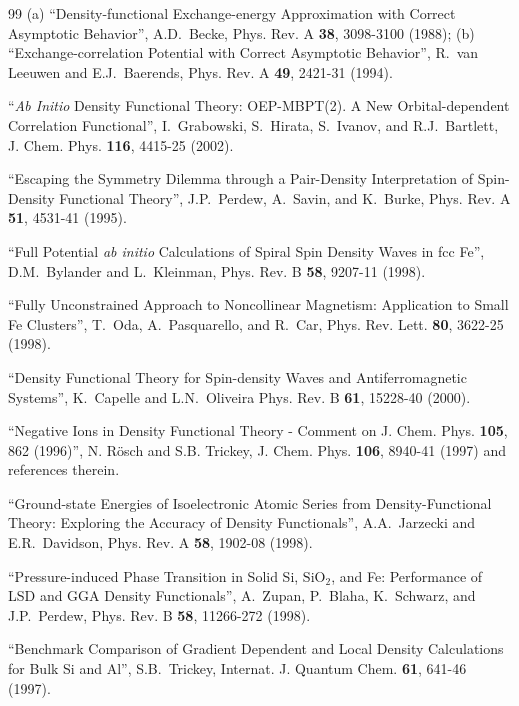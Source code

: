 \documentclass[nofootinbib,floatfix,aps,pra,preprint]{revtex4}
\begin{document}
\begin{thebibliography}{99}
 \textrm{{\small (a) ``Density-functional Exchange-energy
Approximation with Correct Asymptotic Behavior'', A.D.~Becke, Phys. Rev. A 
\textbf{38}, 3098-3100 (1988); (b) ``Exchange-correlation Potential with
Correct Asymptotic Behavior'', R.~van Leeuwen and E.J.~Baerends, Phys. Rev.
A \textbf{49}, 2421-31 (1994). }}

 \textrm{{\small ``\emph{Ab Initio} Density Functional
Theory: OEP-MBPT(2). A New Orbital-dependent Correlation Functional'',
I.~Grabowski, S.~Hirata, S.~Ivanov, and R.J.~Bartlett, J. Chem. Phys. 
\textbf{116}, 4415-25 (2002). }}

 \textrm{{\small ``Escaping the Symmetry Dilemma
through a Pair-Density Interpretation of Spin-Density Functional Theory'',
J.P.~Perdew, A.~Savin, and K.~Burke, Phys. Rev. A \textbf{51}, 4531-41
(1995). }}

 \textrm{{\small ``Full Potential \textit{ab initio}
Calculations of Spiral Spin Density Waves in fcc Fe'', D.M.~Bylander and
L.~Kleinman, Phys. Rev. B \textbf{58}, 9207-11 (1998). }}

 \textrm{{\small ``Fully Unconstrained Approach to Noncollinear
Magnetism: Application to Small Fe Clusters'', T.~Oda, A.~Pasquarello, and
R.~Car, Phys. Rev. Lett. \textbf{80}, 3622-25 (1998). }}

 \textrm{{\small ``Density Functional Theory for
Spin-density Waves and Antiferromagnetic Systems'', K.~Capelle and
L.N.~Oliveira Phys. Rev. B \textbf{61}, 15228-40 (2000). }}

 \textrm{{\small ``Negative Ions in Density Functional
Theory - Comment on J. Chem. Phys. \textbf{105}, 862 (1996)'', N. R{\"o}sch
and S.B. Trickey, J. Chem. Phys. \textbf{106}, 8940-41 (1997) and references
therein. }}

 \textrm{{\small ``Ground-state Energies of
Isoelectronic Atomic Series from Density-Functional Theory: Exploring the
Accuracy of Density Functionals'', A.A.~Jarzecki and E.R.~Davidson, Phys.
Rev. A \textbf{58}, 1902-08 (1998). }}

 \textrm{{\small ``Pressure-induced Phase Transition in
Solid Si, $\mathrm{SiO_{2}}$, and Fe: Performance of LSD and GGA Density
Functionals'', A.~Zupan, P.~Blaha, K.~Schwarz, and J.P.~Perdew, Phys. Rev. B 
\textbf{58}, 11266-272 (1998). }}

 \textrm{{\small ``Benchmark Comparison of Gradient
Dependent and Local Density Calculations for Bulk Si and Al'', S.B.~Trickey,
Internat. J. Quantum Chem. \textbf{61}, 641-46 (1997). }}


\end{thebibliography}
\end{document}
